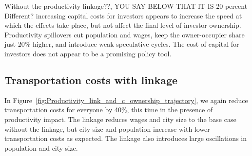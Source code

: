 {\color{red}Without the productivity linkage??, YOU SAY BELOW THAT IT IS 20 percent Different?} increasing capital costs for investors appears to increase the speed at which the effects take place, but not affect the final level of investor ownership. Productivity spillovers cut population and wages, keep the owner-occupier share just 20\% higher, and introduce weak speculative cycles. The cost of capital for investors does not appear to be a promising policy tool.


 \newpage

\subsection{Transportation costs  with linkage}\label{subsec-transport-link}

In Figure~\ref{fig:Productivity_link_and_c_ownership_trajectory}, we again reduce transportation costs for everyone by 40\%, this time in the presence of productivity impact. The linkage reduces wages and city size to the base case without the linkage, but city size and population increase with lower transportation costs as expected. The linkage also introduces large oscillations in population and city size.  %



